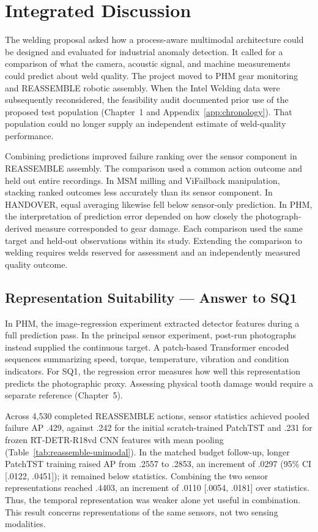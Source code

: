 \chapter{Integrated Discussion}
\label{ch:discussion}

The welding proposal asked how a process-aware multimodal architecture could be designed and evaluated for industrial anomaly detection. It called for a comparison of what the camera, acoustic signal, and machine measurements could predict about weld quality. The project moved to PHM gear monitoring and REASSEMBLE robotic assembly. When the Intel Welding data were subsequently reconsidered, the feasibility audit documented prior use of the proposed test population (Chapter~1 and Appendix~\ref{app:chronology}). That population could no longer supply an independent estimate of weld-quality performance.

Combining predictions improved failure ranking over the sensor component in REASSEMBLE assembly. The comparison used a common action outcome and held out entire recordings. In MSM milling and ViFailback manipulation, stacking ranked outcomes less accurately than its sensor component. In HANDOVER, equal averaging likewise fell below sensor-only prediction. In PHM, the interpretation of prediction error depended on how closely the photograph-derived measure corresponded to gear damage. Each comparison used the same target and held-out observations within its study. Extending the comparison to welding requires welds reserved for assessment and an independently measured quality outcome.

\section{Representation Suitability --- Answer to SQ1}
In PHM, the image-regression experiment extracted detector features during a full prediction pass. In the principal sensor experiment, post-run photographs instead supplied the continuous target. A patch-based Transformer encoded sequences summarizing speed, torque, temperature, vibration and condition indicators. For SQ1, the regression error measures how well this representation predicts the photographic proxy. Assessing physical tooth damage would require a separate reference (Chapter~5).

Across 4,530 completed REASSEMBLE actions, sensor statistics achieved pooled failure AP .429, against .242 for the initial scratch-trained PatchTST and .231 for frozen RT-DETR-R18vd CNN features with mean pooling (Table~\ref{tab:reassemble-unimodal}). In the matched budget follow-up, longer PatchTST training raised AP from .2557 to .2853, an increment of .0297 (95\% CI [.0122, .0451]); it remained below statistics. Combining the two sensor representations reached .4403, an increment of .0110 [.0054, .0181] over statistics. Thus, the temporal representation was weaker alone yet useful in combination. This result concerns representations of the same sensors, not two sensing modalities.

